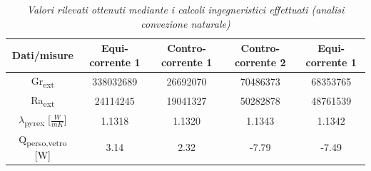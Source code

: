 \documentclass[a4paper,10pt]{article}                                                                                       %
\begin{document}
\begin{table}[ht!]                                                                                                          %
  \centering                                                                                                                %
  \begin{tabular}{||c|c|c|c|c||}                                                                                            %
    \hline
    Dati/misure                                     & Equi-corrente 1 & Contro-corrente 1 & Contro-corrente 2 & Equi-corrente 1 \\
    \hline\hline
    Gr\textsubscript{ext}                           & 338032689       & 26692070          & 70486373          & 68353765        \\  
    Ra\textsubscript{ext}                           & 24114245        & 19041327          & 50282878          & 48761539        \\
    $\lambda$\textsubscript{pyrex} [$\frac{W}{mK}$] & 1.1318          & 1.1320            & 1.1343            & 1.1342          \\
    Q\textsubscript{perso,vetro} [W]                & 3.14            & 2.32              & -7.79             & -7.49           \\
    \hline
  \end{tabular}                                                                                                             %
  \caption{\textit{Valori rilevati ottenuti mediante i calcoli ingegneristici effettuati (analisi convezione naturale)}}    %
  \label{tab:nat_conv_calcs}                                                                                                %
\end{table}                                                                                                                 %
\end{document}
